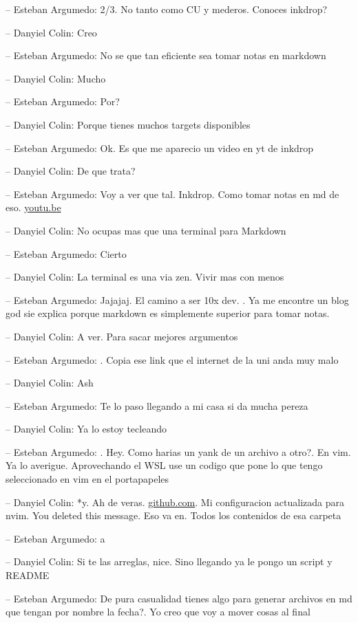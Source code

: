 -- Esteban Argumedo: 2/3. No tanto como CU y mederos. Conoces inkdrop?

-- Danyiel Colin: Creo

-- Esteban Argumedo: No se que tan eficiente sea tomar notas en markdown

-- Danyiel Colin: Mucho

-- Esteban Argumedo: Por?

-- Danyiel Colin: Porque tienes muchos targets disponibles

-- Esteban Argumedo: Ok. Es que me aparecio un video en yt de inkdrop

-- Danyiel Colin: De que trata?

-- Esteban Argumedo: Voy a ver que tal. Inkdrop. Como tomar notas en md
de eso. \href{https://youtu.be/-qBavwqc_mY}{youtu.be}

-- Danyiel Colin: No ocupas mas que una terminal para Markdown

-- Esteban Argumedo: Cierto

-- Danyiel Colin: La terminal es una via zen. Vivir mas con menos

-- Esteban Argumedo: Jajajaj. El camino a ser 10x dev. . Ya me encontre
un blog god sie explica porque markdown es simplemente superior para
tomar notas.

-- Danyiel Colin: A ver. Para sacar mejores argumentos

-- Esteban Argumedo: . Copia ese link que el internet de la uni anda muy
malo

-- Danyiel Colin: Ash

-- Esteban Argumedo: Te lo paso llegando a mi casa si da mucha pereza

-- Danyiel Colin: Ya lo estoy tecleando

-- Esteban Argumedo: . Hey. Como harias un yank de un archivo a otro?.
En vim. Ya lo averigue. Aprovechando el WSL use un codigo que pone lo
que tengo seleccionado en vim en el portapapeles

-- Danyiel Colin: *y. Ah de veras.
\href{https://github.com/DanEscher98/EmbeddedScripts/tree/main/Scripts\%2FWorkflows\%2FDotFiles\%2FIDEs\%2Fnvim}{github.com}.
Mi configuracion actualizada para nvim. You deleted this message. Eso va
en. Todos los contenidos de esa carpeta

-- Esteban Argumedo: a

-- Danyiel Colin: Si te las arreglas, nice. Sino llegando ya le pongo un
script y README

-- Esteban Argumedo: De pura casualidad tienes algo para generar
archivos en md que tengan por nombre la fecha?. Yo creo que voy a mover
cosas al final

